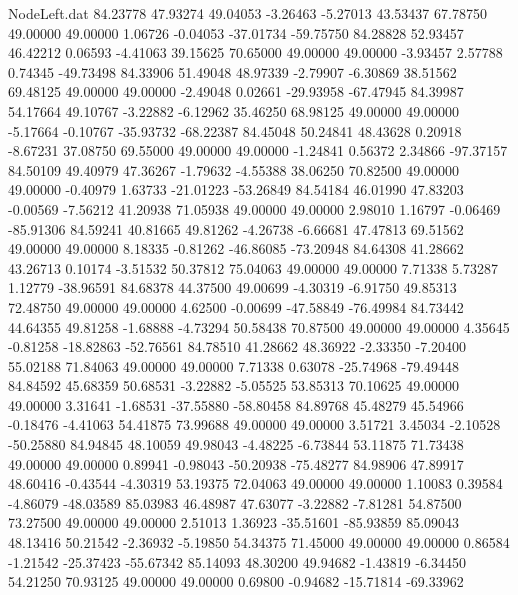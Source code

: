 \begin{filecontents}{NodeLeft.dat}
  84.23778   47.93274   49.04053    -3.26463   -5.27013   43.53437   67.78750   49.00000   49.00000    1.06726   -0.04053  -37.01734  -59.75750
  84.28828   52.93457   46.42212     0.06593   -4.41063   39.15625   70.65000   49.00000   49.00000   -3.93457    2.57788    0.74345  -49.73498
  84.33906   51.49048   48.97339    -2.79907   -6.30869   38.51562   69.48125   49.00000   49.00000   -2.49048    0.02661  -29.93958  -67.47945
  84.39987   54.17664   49.10767    -3.22882   -6.12962   35.46250   68.98125   49.00000   49.00000   -5.17664   -0.10767  -35.93732  -68.22387
  84.45048   50.24841   48.43628     0.20918   -8.67231   37.08750   69.55000   49.00000   49.00000   -1.24841    0.56372    2.34866  -97.37157
  84.50109   49.40979   47.36267    -1.79632   -4.55388   38.06250   70.82500   49.00000   49.00000   -0.40979    1.63733  -21.01223  -53.26849
  84.54184   46.01990   47.83203    -0.00569   -7.56212   41.20938   71.05938   49.00000   49.00000    2.98010    1.16797   -0.06469  -85.91306
  84.59241   40.81665   49.81262    -4.26738   -6.66681   47.47813   69.51562   49.00000   49.00000    8.18335   -0.81262  -46.86085  -73.20948
  84.64308   41.28662   43.26713     0.10174   -3.51532   50.37812   75.04063   49.00000   49.00000    7.71338    5.73287    1.12779  -38.96591
  84.68378   44.37500   49.00699    -4.30319   -6.91750   49.85313   72.48750   49.00000   49.00000    4.62500   -0.00699  -47.58849  -76.49984
  84.73442   44.64355   49.81258    -1.68888   -4.73294   50.58438   70.87500   49.00000   49.00000    4.35645   -0.81258  -18.82863  -52.76561
  84.78510   41.28662   48.36922    -2.33350   -7.20400   55.02188   71.84063   49.00000   49.00000    7.71338    0.63078  -25.74968  -79.49448
  84.84592   45.68359   50.68531    -3.22882   -5.05525   53.85313   70.10625   49.00000   49.00000    3.31641   -1.68531  -37.55880  -58.80458
  84.89768   45.48279   45.54966    -0.18476   -4.41063   54.41875   73.99688   49.00000   49.00000    3.51721    3.45034   -2.10528  -50.25880
  84.94845   48.10059   49.98043    -4.48225   -6.73844   53.11875   71.73438   49.00000   49.00000    0.89941   -0.98043  -50.20938  -75.48277
  84.98906   47.89917   48.60416    -0.43544   -4.30319   53.19375   72.04063   49.00000   49.00000    1.10083    0.39584   -4.86079  -48.03589
  85.03983   46.48987   47.63077    -3.22882   -7.81281   54.87500   73.27500   49.00000   49.00000    2.51013    1.36923  -35.51601  -85.93859
  85.09043   48.13416   50.21542    -2.36932   -5.19850   54.34375   71.45000   49.00000   49.00000    0.86584   -1.21542  -25.37423  -55.67342
  85.14093   48.30200   49.94682    -1.43819   -6.34450   54.21250   70.93125   49.00000   49.00000    0.69800   -0.94682  -15.71814  -69.33962

\end{filecontents}
